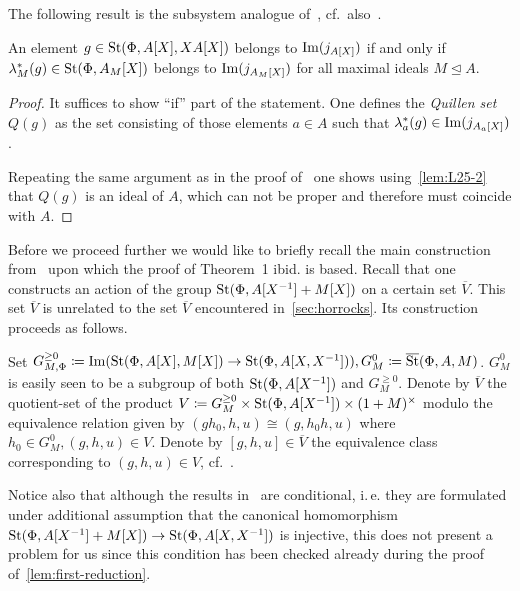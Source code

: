 The following result is the subsystem analogue of~\cite[Theorem~2]{LS17}, cf.\ also~\cite[Theorem~2.1]{Tu83}.
\begin{cor} \label{cor:QS-subsystem}
    An element $g \in \operatorname{St}(\Phi, A[X], XA[X])$ belongs to $\operatorname{Im}(j_{A[X]})$ if and only if
     $\lambda_M^*(g) \in \operatorname{St}(\Phi, A_M[X])$ belongs to $\operatorname{Im}(j_{A_M[X]})$ for all maximal ideals $M \trianglelefteq A$.
\end{cor}
\begin{proof}
    It suffices to show ``if'' part of the statement.
    One defines the \textit{Quillen set} $Q(g)$ as the set consisting of those elements $a \in A$
    such that $\lambda_a^*(g) \in \operatorname{Im}(j_{A_a[X]})$.

    Repeating the same argument as in the proof of~\cite[Theorem~2]{S15} one shows using~\cref{lem:L25-2}
     that $Q(g)$ is an ideal of $A$, which can not be proper and therefore must coincide with $A$.
\end{proof}

Before we proceed further we would like to briefly recall the main construction from~\cite{LS20} upon which
 the proof of Theorem~1 ibid. is based.
Recall that one constructs an action of the group $\operatorname{St}(\Phi, A[X^{-1}] + M[X])$ on a certain set $\overline{V}$.
This set $\overline{V}$ is unrelated to the set $\overline{V}$ encountered in~\cref{sec:horrocks}.
Its construction proceeds as follows.

Set $G_{M, \Phi}^{\geq 0} \coloneqq \operatorname{Im}(\operatorname{St}(\Phi, A[X], M[X]) \to \operatorname{St}(\Phi, A[X, X^{-1}])), G_M^0 \coloneqq \overline{\operatorname{St}}(\Phi, A, M)$.
$G_M^0$ is easily seen to be a subgroup of both $\operatorname{St}(\Phi, A[X^{-1}])$ and $G_M^{\geq 0}$.
Denote by $\overline{V}$ the quotient-set of the product $V \coloneqq G_M^{\geq 0} \times \operatorname{St}(\Phi, A[X^{-1}]) \times (1 + M)^\times$
modulo the equivalence relation given by $(gh_0, h, u) \cong (g, h_0h, u)$ where $h_0 \in G_M^0, (g, h, u) \in V.$
Denote by $[g, h, u] \in \overline{V}$ the equivalence class corresponding to $(g, h, u)\in V$, cf.~\cite[\S~5.4]{LS20}.

Notice also that although the results in~\cite[\S~5.5]{LS20} are conditional,
 i.\,e. they are formulated under additional assumption that the canonical homomorphism
 $\operatorname{St}(\Phi, A[X^{-1}] + M[X]) \to \operatorname{St}(\Phi, A[X, X^{-1}])$ is injective,
this does not present a problem for us since this condition has been checked already during the proof of~\cref{lem:first-reduction}.

